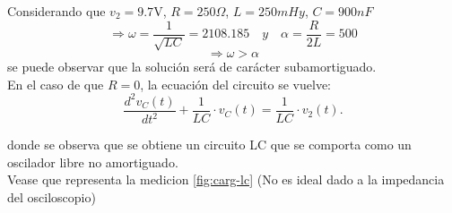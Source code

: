 \documentclass[a4paper]{article}
\begin{document}
Considerando que $v_2 = 9.7\textrm{V}$, $R = 250\Omega$, $L = 250mHy$, $C = 900nF$ \[\Rightarrow \omega=\frac{1}{\sqrt{LC}}= 2108.185\quad y \quad \alpha=\frac{R}{2L}= 500\] \[\Rightarrow \omega > \alpha\] se puede observar que la solución será de carácter subamortiguado.\\

En el caso de que $R=0$, la ecuación del circuito se vuelve:
\begin{equation}
\frac{d^{2}v_{C}(t)}{dt^{2}}+\frac{1}{LC}\cdot v_{C}(t)=\frac{1}{LC}\cdot v_{2}(t).
\end{equation}



donde se observa que se obtiene un circuito LC que se comporta como un oscilador libre no amortiguado.\\
Vease que representa la medicion \ref{fig:carg-lc} (No es ideal dado a la impedancia del osciloscopio)
\end{document}

